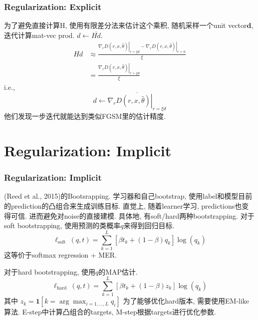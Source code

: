 \documentclass{beamer}
\newcommand{\bs}[1]{\boldsymbol{#1}}
\begin{document}
\begin{frame}
    \frametitle{Regularization: Explicit}

    为了避免直接计算H, 使用有限差分法来估计这个乘积, 
    随机采样一个unit vector$\bs d$, 迭代计算mat-vec prod. 
    $d \leftarrow \overline{H d}$.
    \begin{equation}
        \begin{aligned}
        H d & \approx \frac{\left.\nabla_{r} D(r, x, \hat{\theta})\right|_{r=\xi d}-\left.\nabla_{r} D(r, x, \hat{\theta})\right|_{r=0}}{\xi} \\
        &=\frac{\left.\nabla_{r} D(r, x, \hat{\theta})\right|_{r=\xi d}}{\xi}
        \end{aligned}
    \end{equation}
    i.e.,
    \begin{equation}
        d \leftarrow \overline{\left.\nabla_{r} D(r, x, \hat{\theta})\right|_{r=\xi d}}
    \end{equation}
    他们发现一步迭代就能达到类似FGSM里的估计精度.

\end{frame}

\section{Regularization: Implicit}

\begin{frame}
    \frametitle{Regularization: Implicit}

    (Reed et al., 2015)的Bootsrapping. 学习器和自己bootstrap, 使用label和模型目前的prediction的凸组合来生成训练目标. 直觉上, 随着learner学习, predictions也变得可信. 进而避免对noise的直接建模. 具体地, 有soft/hard两种bootstrapping. 对于soft bootstrapping, 使用预测的类概率$q$来得到回归目标.
    \begin{equation}
        \ell_{\text {soft }}(q, t)=\sum_{k=1}^{L}\left[\beta t_{k}+(1-\beta) q_{k}\right] \log \left(q_{k}\right)
    \end{equation}
    这等价于softmax regression + MER.

    对于hard bootstrapping, 使用$q$的MAP估计.
    \begin{equation}
        \ell_{\text {hard }}(q, t)=\sum_{k=1}^{L}\left[\beta t_{k}+(1-\beta) z_{k}\right] \log \left(q_{k}\right)
    \end{equation}
    其中
    $z_{k}=\mathbf{1}\left[k=\arg \max _{i=1, \ldots, L} q_{i}\right]$
    为了能够优化hard版本, 需要使用EM-like算法. E-step中计算凸组合的targets, M-step根据targets进行优化参数.

\end{frame}
\end{document}

